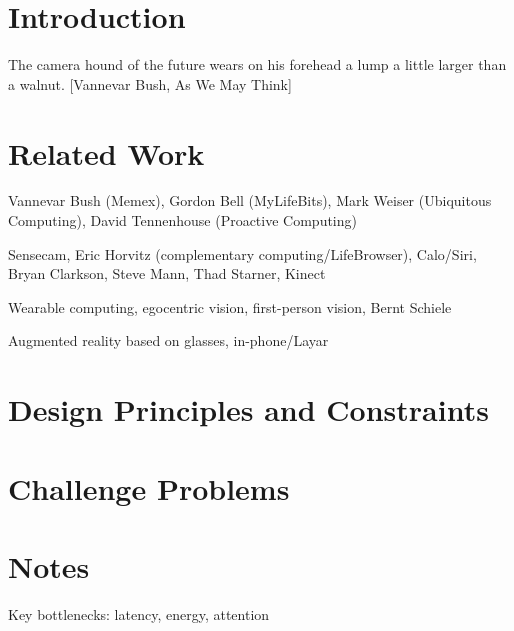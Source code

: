 \documentclass{ubicomp2012}
\begin{document}
\section{Introduction}
The camera hound of the future wears on his forehead a lump a little
larger than a walnut. [Vannevar Bush, As We May Think]


\section{Related Work}
Vannevar Bush (Memex), Gordon Bell (MyLifeBits), Mark Weiser
(Ubiquitous Computing), David Tennenhouse (Proactive Computing)

Sensecam, Eric Horvitz (complementary computing/LifeBrowser),
Calo/Siri, Bryan Clarkson, Steve Mann, Thad Starner, Kinect
 
Wearable computing, egocentric vision, first-person vision, Bernt
Schiele

Augmented reality based on glasses, in-phone/Layar

\section{Design Principles and Constraints}

\section{Challenge Problems}

\section{Notes}
\itemize
\item {Key bottlenecks: latency, energy, attention}


\nocite{example-journal,example-abstracts,example-conference2}



\end{document}
